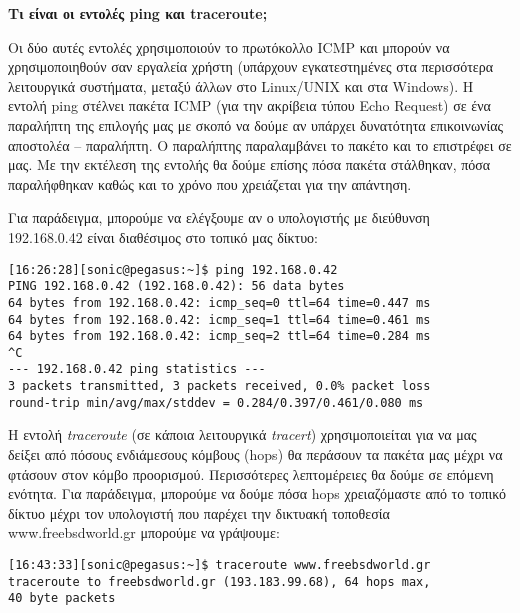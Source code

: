 \begin{inthebox}
\textbf{Τι είναι οι εντολές ping και traceroute;}

Οι δύο αυτές εντολές χρησιμοποιούν το πρωτόκολλο ICMP και μπορούν να χρησιμοποιηθούν σαν εργαλεία χρήστη (υπάρχουν εγκατεστημένες στα περισσότερα λειτουργικά συστήματα, μεταξύ άλλων στο Linux/UNIX και στα Windows). Η εντολή ping στέλνει πακέτα ICMP (για την ακρίβεια τύπου Echo Request) σε ένα παραλήπτη της επιλογής μας με σκοπό να δούμε αν υπάρχει δυνατότητα επικοινωνίας αποστολέα -- παραλήπτη. Ο παραλήπτης παραλαμβάνει το πακέτο και το επιστρέφει σε μας. Με την εκτέλεση της εντολής θα δούμε επίσης πόσα πακέτα στάλθηκαν, πόσα παραλήφθηκαν καθώς και το χρόνο που χρειάζεται για την απάντηση.

Για παράδειγμα, μπορούμε να ελέγξουμε αν ο υπολογιστής με διεύθυνση\\ 192.168.0.42 είναι διαθέσιμος στο τοπικό μας δίκτυο:

\small
\begin{verbatim}
[16:26:28][sonic@pegasus:~]$ ping 192.168.0.42
PING 192.168.0.42 (192.168.0.42): 56 data bytes
64 bytes from 192.168.0.42: icmp_seq=0 ttl=64 time=0.447 ms
64 bytes from 192.168.0.42: icmp_seq=1 ttl=64 time=0.461 ms
64 bytes from 192.168.0.42: icmp_seq=2 ttl=64 time=0.284 ms
^C
--- 192.168.0.42 ping statistics ---
3 packets transmitted, 3 packets received, 0.0% packet loss
round-trip min/avg/max/stddev = 0.284/0.397/0.461/0.080 ms
\end{verbatim}
\normalsize

Η εντολή \emph{traceroute} (σε κάποια λειτουργικά \emph{tracert}) χρησιμοποιείται για να μας δείξει από πόσους ενδιάμεσους κόμβους (hops) θα περάσουν τα πακέτα μας μέχρι να φτάσουν στον κόμβο προορισμού. Περισσότερες λεπτομέρειες θα δούμε σε επόμενη ενότητα. Για παράδειγμα, μπορούμε να δούμε πόσα hops χρειαζόμαστε από το τοπικό δίκτυο μέχρι τον υπολογιστή που παρέχει την δικτυακή τοποθεσία www.freebsdworld.gr μπορούμε να γράψουμε:

\footnotesize
\begin{verbatim}
[16:43:33][sonic@pegasus:~]$ traceroute www.freebsdworld.gr
traceroute to freebsdworld.gr (193.183.99.68), 64 hops max, 
40 byte packets


\end{verbatim}
\end{inthebox}
